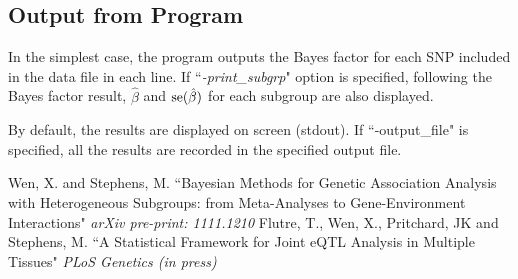 \documentclass[11pt,fleqn]{article}
\begin{document}
\subsection{Output from Program}

In the simplest case, the program outputs the Bayes factor for each SNP included in the data file in each line. If ``{\it -print\_subgrp}" option is specified, following the Bayes factor result, $\hat \beta$ and ${\rm se}(\hat \beta)$ for each subgroup are also displayed.

By default, the results are displayed on screen (stdout). If ``-output\_file" is specified, all the results are recorded in the specified output file.


\newpage
\begin{thebibliography}{5} %
 Wen, X. and Stephens, M. ``Bayesian Methods for Genetic Association Analysis with Heterogeneous Subgroups: from Meta-Analyses to Gene-Environment Interactions" \emph{arXiv pre-print: 1111.1210}
 Flutre, T., Wen, X., Pritchard, JK and Stephens, M. ``A Statistical Framework for Joint eQTL Analysis in Multiple Tissues" \emph{PLoS Genetics (in press)}
\end{thebibliography}
\end{document}
